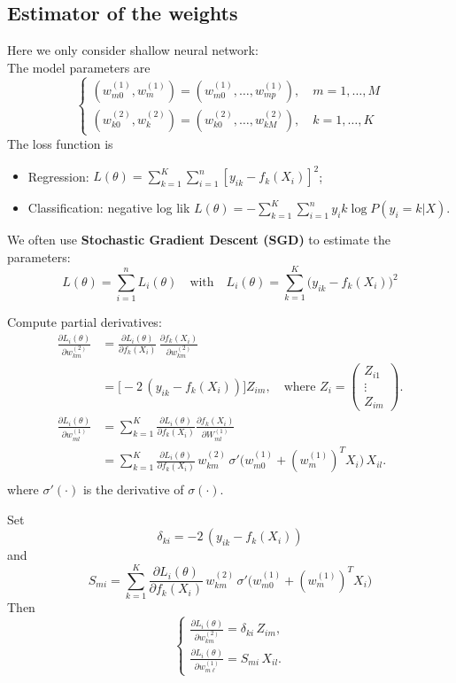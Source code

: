 \documentclass[12pt]{book}
\theoremstyle{definition}
\theoremstyle{remark}
\begin{document}
\subsection{Estimator of the weights}
Here we only consider shallow neural network:\\
The model parameters are 
\[\left\{\begin{matrix}(w_{m0}^{(1)},w_m^{(1)})  = (w_{m0}^{(1)},\dots, w_{mp}^{(1)}),\quad m = 1,\dots, M
 \\(w_{k0}^{(2)},w_k^{(2)})  = (w_{k0}^{(2)},\dots, w_{kM}^{(2)}),\quad k = 1,\dots, K
\end{matrix}\right.\]
The loss function is 
\begin{itemize}
    \item Regression: $L(\theta) = \sum_{k=1}^K \sum_{i=1}^n[y_{ik} - f_k(X_i)]^2$;
    \item Classification: negative log lik $L(\theta) = -\sum_{k=1}^K \sum_{i=1}^ny_ik \log P(y_i = k|X)$.
\end{itemize}

We often use \textbf{Stochastic Gradient Descent (SGD)} to estimate the parameters:
\[L(\theta)=\sum_{i=1}^n L_i(\theta)\quad\text{with}\quad L_i(\theta)=\sum_{k=1}^K\bigl(y_{ik}-f_k(X_i)\bigr)^2\]

Compute partial derivatives:
\begin{align*}
\frac{\partial L_i(\theta)}{\partial w^{(2)}_{km}} 
&=\frac{\partial L_i(\theta)}{\partial f_k(X_i)}
\,\frac{\partial f_k(X_i)}{\partial w^{(2)}_{km}}\\
&=\bigl[-2\,(y_{ik}-f_k(X_i))\bigr]Z_{im},\quad
\text{where }Z_i=\begin{pmatrix}Z_{i1}\\\vdots\\Z_{i m}\end{pmatrix}.\\
\frac{\partial L_i(\theta)}{\partial w^{(1)}_{ml}}
&=\sum_{k=1}^K\frac{\partial L_i(\theta)}{\partial f_k(X_i)}
\frac{\partial f_k(X_i)}{\partial W^{(1)}_{ml}}\\
&=\sum_{k=1}^K\frac{\partial L_i(\theta)}{\partial f_k(X_i)}
\,w^{(2)}_{km}\,\sigma'\bigl(w^{(1)}_{m0}+(w^{(1)}_{m})^T X_i\bigr)\,X_{il}.\\
\end{align*}
where $\sigma'(\cdot)$ is the derivative of $\sigma(\cdot)$.

Set 
\[\delta_{ki} = -2\,(y_{ik}-f_k(X_i))\]
and 
\[S_{mi}=\sum_{k=1}^K\frac{\partial L_i(\theta)}{\partial f_k(X_i)}\,w^{(2)}_{km}\,\sigma'\bigl(w^{(1)}_{m0}+(w^{(1)}_{m})^T X_i\bigr)\]
Then \[
\begin{cases}
\displaystyle
\frac{\partial L_i(\theta)}{\partial w^{(2)}_{km}}=\delta_{ki}\,Z_{im},\\
\displaystyle
\frac{\partial L_i(\theta)}{\partial w^{(1)}_{m\ell}}=S_{mi}\,X_{il}.
\end{cases}\]
\end{document}
